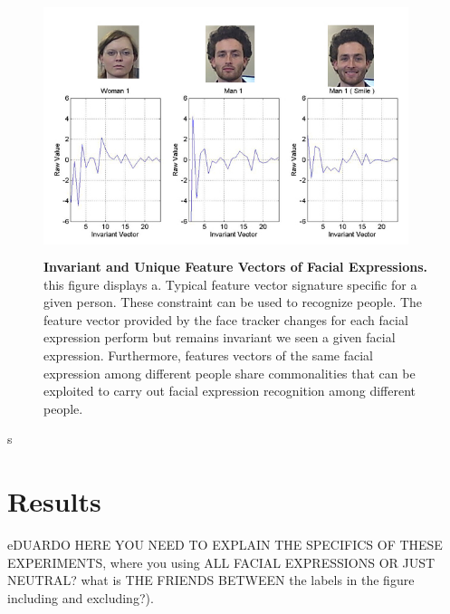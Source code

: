 \documentclass[]{article}
\begin{document}
\begin{figure}[ht]
\begin{center}
\vspace{-3mm}
\includegraphics[width=0.95\textwidth,height=75mm]{figures/comparationBetweenFaces2.jpg}
\end{center}
\caption{\textbf{Invariant and Unique Feature Vectors of Facial Expressions.} this figure displays a. Typical feature 
vector signature specific for a given person. These constraint can be used to recognize people. The feature vector
provided by the face tracker changes for each facial expression perform but remains invariant we seen a given facial 
expression. Furthermore, features vectors of the same facial expression among different people share commonalities that
can be exploited to carry out facial expression recognition among different people.}
\label{comparationBetweenFaces}
\end{figure}s

\section{Results}


 eDUARDO HERE YOU NEED TO EXPLAIN THE SPECIFICS OF THESE EXPERIMENTS, where you using ALL
FACIAL EXPRESSIONS OR JUST NEUTRAL? what is THE FRIENDS BETWEEN the labels in the figure including and excluding?).
\end{document}
